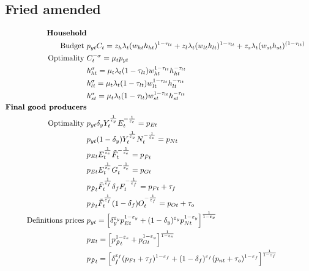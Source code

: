 \subsection{Fried amended}
\begin{align*}
\text{\textbf{Household}}\\
\text{Budget}\ \vspace{4mm}& p_{yt}C_t=z_h \lambda_t (w_{ht}h_{ht})^{1-\tau_{lt}}+z_l \lambda_t (w_{lt}h_{lt})^{1-\tau_{lt}}+z_s\lambda_t(w_{st}h_{st})^{(1-\tau_{lt})}\\
\text{Optimality}\ \vspace{4mm}
& C_t^{-\sigma}= \mu_tp_{yt}\\
& h_{ht}^{\sigma}=\mu_t \lambda_t(1-\tau_{lt})w_{ht}^{1-\tau_{lt}}h_{ht}^{-\tau_{lt}}\\
& h_{lt}^{\sigma}=\mu_t \lambda_t(1-\tau_{lt})w_{lt}^{1-\tau_{lt}}h_{lt}^{-\tau_{lt}}\\
& h_{st}^{\sigma}=\mu_t \lambda_t(1-\tau_{lt})w_{st}^{1-\tau_{lt}}h_{st}^{-\tau_{lt}}
\\
\text{\textbf{Final good producers}}&\\
\text{Optimality}\ \vspace{4mm}& p_{yt}\delta_yY_t^\frac{1}{\varepsilon_y}E_t^{-\frac{1}{\varepsilon_e}}=p_{Et}\\
& p_{yt}(1-\delta_y)Y_t^\frac{1}{\varepsilon_y}N_t^{-\frac{1}{\varepsilon_e}}=p_{Nt}\\
&
p_{Et}E_t^\frac{1}{\varepsilon_e}\tilde{F}_t^{-\frac{1}{\varepsilon_e}}=p_{\tilde{F}t}\\
& p_{Et}E_t^\frac{1}{\varepsilon_e}G_t^{-\frac{1}{\varepsilon_e}}=p_{Gt}\\
& p_{\tilde{F}t}\tilde{F}_t^\frac{1}{\varepsilon_f}\delta_fF_t^{-\frac{1}{\varepsilon_f}}=p_{Ft}+\tau_{f}\\
& p_{\tilde{F}t}\tilde{F}_t^\frac{1}{\varepsilon_f}(1-\delta_f)O_t^{-\frac{1}{\varepsilon_f}}=p_{Ot}+\tau_{o}\\
\text{Definitions prices}\ \vspace{4mm}&
p_{yt}= \left[\delta_y^{\varepsilon_y}p_{Et}^{1-\varepsilon_y}+(1-\delta_y)^{\varepsilon_y}p_{Nt}^{1-\varepsilon_y}\right]^\frac{1}{1-\varepsilon_y}\\
& p_{Et}= \left[p_{\tilde{F}t}^{1-\varepsilon_e}+p_{Gt}^{1-\varepsilon_y}\right]^\frac{1}{1-\varepsilon_e}\\
& p_{\tilde{F}t}= \left[\delta_f^{\varepsilon_f}(p_{Ft}+\tau_{f})^{1-\varepsilon_f}+(1-\delta_f)^{\varepsilon_f}(p_{nt}+\tau_{o})^{1-\varepsilon_f}\right]^\frac{1}{1-\varepsilon_f}\\

\end{align*}

